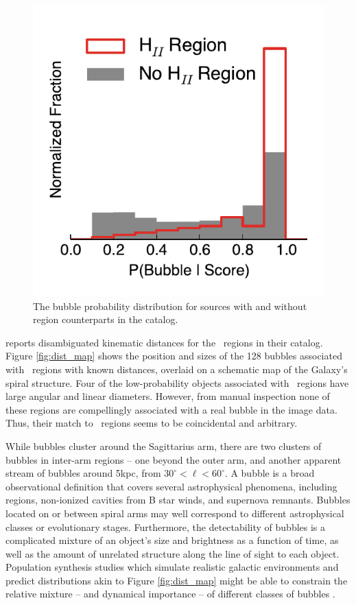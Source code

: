 \begin{figure}[h!]
\includegraphics{dist_hii_score}
\caption{The bubble probability distribution for sources with and without \hii\, region counterparts in the \cite{Anderson11} catalog.}
\label{fig:hii_score}
\end{figure}

\cite{Anderson11} reports disambiguated kinematic distances for the \hii\, regions in their catalog. Figure \ref{fig:dist_map} shows the position and sizes of the 128 bubbles associated with \hii\, regions with known distances, overlaid on a schematic map of the Galaxy's spiral structure. Four of the low-probability objects associated with \hii\, regions have large angular and linear diameters. However, from manual inspection none of these regions are compellingly associated with a real bubble in the image data. Thus, their match to \hii\, regions seems to be coincidental and arbitrary.

While bubbles cluster around the Sagittarius arm, there are two clusters of bubbles in inter-arm regions -- one beyond the outer arm, and another apparent stream of bubbles around 5kpc, from $30^\circ < \ell < 60^\circ$. A bubble is a broad observational definition that covers several astrophysical phenomena, including \hii\, regions, non-ionized cavities from B star winds, and supernova remnants. Bubbles located on or between spiral arms may well correspond to different astrophysical classes or evolutionary stages. Furthermore, the detectability of bubbles is a complicated mixture of an object's size and brightness as a function of time, as well as the amount of unrelated structure along the line of sight to each object. Population synthesis studies which simulate realistic galactic environments and predict distributions akin to Figure \ref{fig:dist_map} might be able to constrain the relative mixture -- and dynamical importance -- of different classes of bubbles \citep{Robin03,Robitaille12}.

